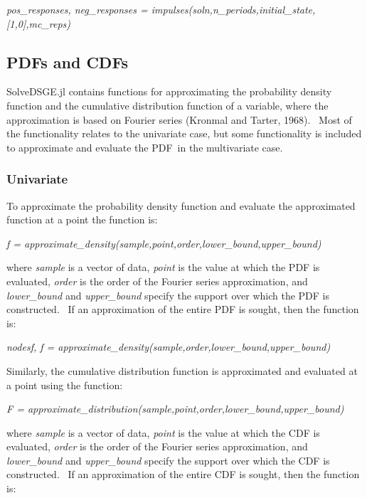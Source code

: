 \documentclass[notitlepage,11pt]{article}
\begin{document}
\bigskip

\textit{pos\_responses, neg\_responses =
impulses(soln,n\_periods,initial\_state,[1,0],mc\_reps)}

\bigskip

\subsection{PDFs and CDFs}

SolveDSGE.jl contains functions for approximating the probability density
function and the cumulative distribution function of a variable, where the
approximation is based on Fourier series (Kronmal and Tarter, 1968). \ Most
of the functionality relates to the univariate case, but some functionality
is included to approximate and evaluate the PDF\ in the multivariate case.

\subsubsection{Univariate}

To approximate the probability density function and evaluate the
approximated function at a point the function is:

\bigskip

\textit{f =
approximate\_density(sample,point,order,lower\_bound,upper\_bound)}

\bigskip

where \textit{sample} is a vector of data, \textit{point} is the value at
which the PDF is evaluated, \textit{order} is the order of the Fourier
series approximation, and \textit{lower\_bound} and \textit{upper\_bound}
specify the support over which the PDF is constructed. \ If an approximation
of the entire PDF is sought, then the function is:

\bigskip

\textit{nodesf, f =
approximate\_density(sample,order,lower\_bound,upper\_bound)}

\bigskip

Similarly, the cumulative distribution function is approximated and
evaluated at a point using the function:

\bigskip

\textit{F =
approximate\_distribution(sample,point,order,lower\_bound,upper\_bound)}

\bigskip

where \textit{sample} is a vector of data, \textit{point} is the value at
which the CDF is evaluated, \textit{order} is the order of the Fourier
series approximation, and \textit{lower\_bound} and \textit{upper\_bound}
specify the support over which the CDF is constructed. \ If an approximation
of the entire CDF is sought, then the function is:
\end{document}

